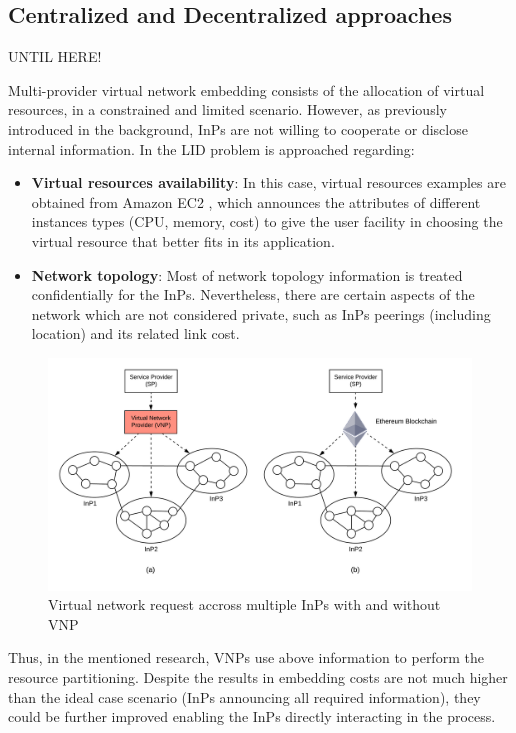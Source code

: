 \subsection{Centralized and Decentralized approaches}

UNTIL HERE! 


Multi-provider virtual network embedding consists of the allocation of virtual resources, in a constrained and limited scenario. However, as previously introduced in the background, InPs are not willing to cooperate or disclose internal information. In \cite{dietrich2015multi} the LID problem is approached regarding: 

\begin{itemize}
	\item \textbf{Virtual resources availability}: In this case, virtual resources examples are obtained from Amazon EC2 \cite{amazonEC2}, which announces the attributes of different instances types (CPU, memory, cost) to give the user facility in choosing the virtual resource that better fits in its application.
	\item \textbf{Network topology}: Most of network topology information is treated confidentially for the InPs. Nevertheless, there are certain aspects of the network which are not considered private, such as InPs peerings (including location) and its related link cost.
\end{itemize}

\begin{figure}
	\includegraphics[width=1\linewidth]{gfx/multiprov.png}    
  \caption{Virtual network request accross multiple InPs with and without VNP \citep{dietrich2015multi}}
  \label{fig:multiprov}
\end{figure}

Thus, in the mentioned research, VNPs use above information to perform the resource partitioning. Despite the results in embedding costs are not much higher than the ideal case scenario (InPs announcing all required information), they could be further improved enabling the InPs directly interacting in the process.

